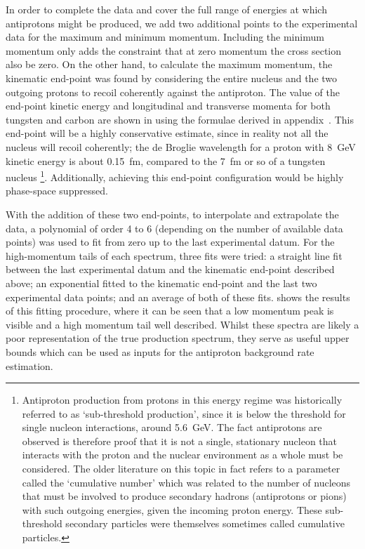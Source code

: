 \FigAntiprotonEndpoint
In order to complete the data and cover the full range of energies at which antiprotons might be produced, we add two additional points to the experimental data for the maximum and minimum momentum.
Including the minimum momentum only adds the constraint that at zero momentum the cross section also be zero.
On the other hand, to calculate the maximum momentum, the kinematic end-point was found by considering the entire nucleus and the two outgoing protons to recoil coherently against the antiproton.
The value of the end-point kinetic energy and longitudinal and transverse momenta for both tungsten and carbon are shown in  using the formulae derived in appendix~.
This end-point will be a highly conservative estimate, since in reality not all the nucleus will recoil coherently;  the de Broglie wavelength for a proton with 8~GeV kinetic energy is about 0.15~fm, compared to the 7~fm or so of a tungsten nucleus%
\footnote{Antiproton production from protons in this energy regime was historically referred to as `sub-threshold production', since it is below the threshold for single nucleon interactions, around 5.6~GeV.
The fact antiprotons are observed is therefore proof that it is not a single, stationary nucleon that interacts with the proton and the nuclear environment as a whole must be considered.
  The older literature on this topic in fact refers to a parameter called the `cumulative number' which was related to the number of nucleons that must be involved to produce secondary hadrons (\eg antiprotons or pions) with such outgoing energies, given the incoming proton energy.  
These sub-threshold secondary particles were themselves sometimes called cumulative particles.}.
Additionally, achieving this end-point configuration would be highly phase-space suppressed.

\FigAntiprotonFits
With the addition of these two end-points, to interpolate and extrapolate the data, a polynomial of order 4 to 6 (depending on the number of available data points) was used to fit from zero up to the last experimental datum.
For the high-momentum tails of each spectrum, three fits were tried: a straight line fit between the last experimental datum and the kinematic end-point described above; an exponential fitted to the kinematic end-point and the last two experimental data points; and an average of both of these fits.
 shows the results of this fitting procedure, where it can be seen that a low momentum peak is visible and a high momentum tail well described.
Whilst these spectra are likely a poor representation of the true production spectrum, they serve as useful upper bounds which can be used as inputs for the antiproton background rate estimation.

